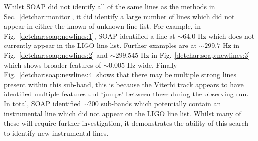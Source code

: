 Whilst SOAP did not identify all of the same lines as the methods in Sec.~\ref{detchar:monitor}, it did identify a large number of lines which did not appear in either the known of unknown line list.
For example, in Fig.~\ref{detchar:soap:newlines:1}, SOAP identified a line at $\sim 64.0$ Hz which does not currently appear in the \gls{LIGO} line list.
Further examples are at $\sim 299.7$ Hz in Fig.~\ref{detchar:soap:newlines:2} and $\sim 299.545$ Hz in Fig.~\ref{detchar:soap:newlines:3} which shows broader features of $\sim 0.005$ Hz wide. Finally Fig.~\ref{detchar:soap:newlines:4} shows that there may be multiple strong lines present within this sub-band, this is because the Viterbi track appears to have identified multiple features and `jumps' between these during the observing run.
In total, SOAP identified $\sim 200$ sub-bands which potentially contain an instrumental line which did not appear on the \gls{LIGO} line list. 
Whilst many of these will require further investigation, it demonstrates the ability of this search to identify new instrumental lines.

